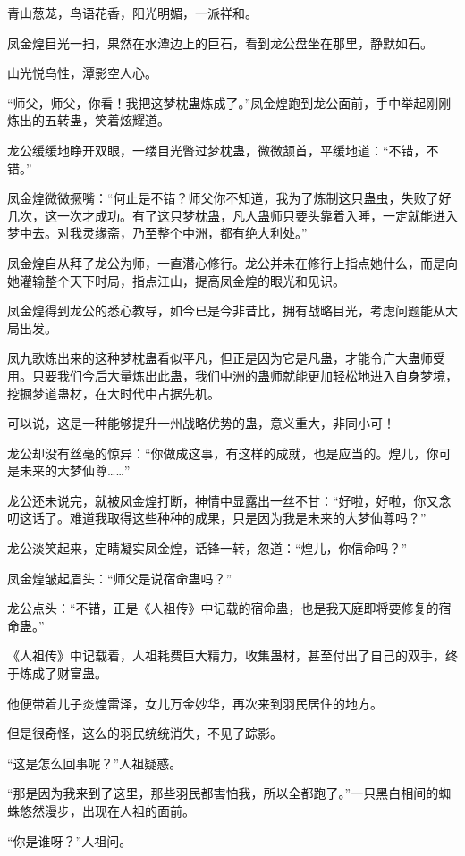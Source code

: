 \begin{this_body}
青山葱茏，鸟语花香，阳光明媚，一派祥和。

凤金煌目光一扫，果然在水潭边上的巨石，看到龙公盘坐在那里，静默如石。

山光悦鸟性，潭影空人心。

“师父，师父，你看！我把这梦枕蛊炼成了。”凤金煌跑到龙公面前，手中举起刚刚炼出的五转蛊，笑着炫耀道。

龙公缓缓地睁开双眼，一缕目光瞥过梦枕蛊，微微颔首，平缓地道：“不错，不错。”

凤金煌微微撅嘴：“何止是不错？师父你不知道，我为了炼制这只蛊虫，失败了好几次，这一次才成功。有了这只梦枕蛊，凡人蛊师只要头靠着入睡，一定就能进入梦中去。对我灵缘斋，乃至整个中洲，都有绝大利处。”

凤金煌自从拜了龙公为师，一直潜心修行。龙公并未在修行上指点她什么，而是向她灌输整个天下时局，指点江山，提高凤金煌的眼光和见识。

凤金煌得到龙公的悉心教导，如今已是今非昔比，拥有战略目光，考虑问题能从大局出发。

凤九歌炼出来的这种梦枕蛊看似平凡，但正是因为它是凡蛊，才能令广大蛊师受用。只要我们今后大量炼出此蛊，我们中洲的蛊师就能更加轻松地进入自身梦境，挖掘梦道蛊材，在大时代中占据先机。

可以说，这是一种能够提升一州战略优势的蛊，意义重大，非同小可！

龙公却没有丝毫的惊异：“你做成这事，有这样的成就，也是应当的。煌儿，你可是未来的大梦仙尊……”

龙公还未说完，就被凤金煌打断，神情中显露出一丝不甘：“好啦，好啦，你又念叨这话了。难道我取得这些种种的成果，只是因为我是未来的大梦仙尊吗？”

龙公淡笑起来，定睛凝实凤金煌，话锋一转，忽道：“煌儿，你信命吗？”

凤金煌皱起眉头：“师父是说宿命蛊吗？”

龙公点头：“不错，正是《人祖传》中记载的宿命蛊，也是我天庭即将要修复的宿命蛊。”

《人祖传》中记载着，人祖耗费巨大精力，收集蛊材，甚至付出了自己的双手，终于炼成了财富蛊。

他便带着儿子炎煌雷泽，女儿万金妙华，再次来到羽民居住的地方。

但是很奇怪，这么的羽民统统消失，不见了踪影。

“这是怎么回事呢？”人祖疑惑。

“那是因为我来到了这里，那些羽民都害怕我，所以全都跑了。”一只黑白相间的蜘蛛悠然漫步，出现在人祖的面前。

“你是谁呀？”人祖问。


\end{this_body}
